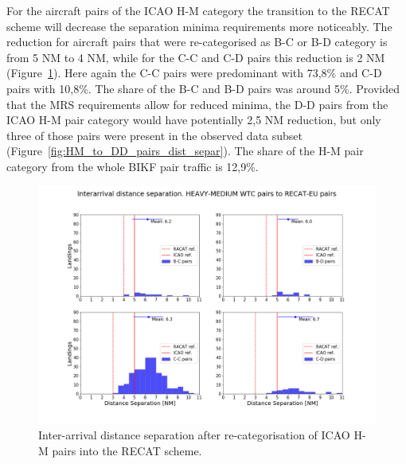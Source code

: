 For the aircraft pairs of the ICAO H-M category the transition to the RECAT scheme will decrease the separation minima requirements more noticeably. The reduction for aircraft pairs that were re-categorised as B-C or B-D category is from 5 NM to 4 NM, while for the C-C and C-D pairs this reduction is 2 NM (Figure~\ref{fig:HM_to_RECAT_pairs_dist_separ}). Here again the C-C pairs were predominant with 73,8\% and C-D pairs with 10,8\%. The share of the B-C and B-D pairs was around 5\%. Provided that the MRS requirements allow for reduced minima, the D-D pairs from the ICAO H-M pair category would have potentially 2,5 NM reduction, but only three of those pairs were present in the observed data subset (Figure~\ref{fig:HM_to_DD_pairs_dist_separ}). The share of the H-M pair category from the whole BIKF pair traffic is 12,9\%.
\begin{figure}[h]
    \centering
    \includegraphics[width=1\textwidth]{graphics/fig_HM_to_RECAT_pairs_dist_separ.png}
    \caption[Inter-arrival distance separation of ICAO H-M pairs into the RECAT scheme]{Inter-arrival distance separation after re-categorisation of ICAO H-M pairs into the RECAT scheme.}
    \label{fig:HM_to_RECAT_pairs_dist_separ}
\end{figure}

